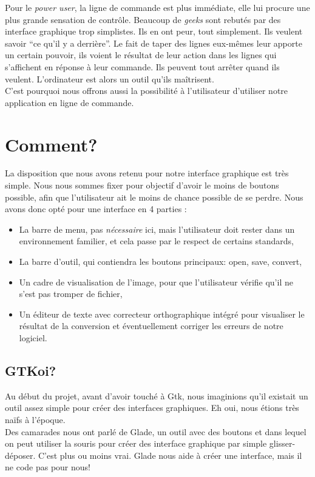 \documentclass[a4paper,12pt]{report}
\begin{document}
Pour le \emph{power user}, la ligne de commande est plus immédiate, elle lui procure une plus grande sensation de contrôle. Beaucoup de \emph{geeks} sont rebutés par des interface graphique trop simplistes. Ils en ont peur, tout simplement. Ils veulent savoir ``ce qu’il y a derrière''. Le fait de taper des lignes eux-mêmes leur apporte un certain pouvoir, ils voient le résultat de leur action dans les lignes qui s’affichent en réponse à leur commande. Ils peuvent tout arrêter quand ils veulent. L’ordinateur est alors un outil qu’ils maîtrisent. \\
C’est pourquoi nous offrons aussi la possibilité à l’utilisateur d’utiliser notre application en ligne de commande.


\pagebreak


\section{Comment?} %
\label{sec:comment_}
La disposition que nous avons retenu pour notre interface graphique est très simple. Nous nous sommes fixer pour objectif d’avoir le moins de boutons possible, afin que l’utilisateur ait le moins de chance possible de se perdre.
Nous avons donc opté pour une interface en 4 parties :\\

\begin{itemize}
	\item La barre de menu, pas \emph{nécessaire} ici, mais l’utilisateur doit rester dans un environnement familier, et cela passe par le respect de certains standards,
	\item La barre d’outil, qui contiendra les boutons principaux: open, save, convert,
	\item Un cadre de visualisation de l’image, pour que l’utilisateur vérifie qu’il ne s’est pas tromper de fichier,
	\item Un éditeur de texte avec correcteur orthographique intégré pour visualiser le résultat de la conversion et éventuellement corriger les erreurs de notre logiciel.
\end{itemize}



\subsection{GTKoi?} %
\label{sec:gtkoi_}
Au début du projet, avant d’avoir touché à Gtk, nous imaginions qu’il existait un outil assez simple pour créer des interfaces graphiques. Eh oui, nous étions très naïfs à l’époque. \\
Des camarades nous ont parlé de Glade, un outil avec des boutons et dans lequel on peut utiliser la souris pour créer des interface graphique par simple glisser-déposer. C'est plus ou moins vrai. Glade nous aide à créer une interface, mais il ne code pas pour nous!
\end{document}
